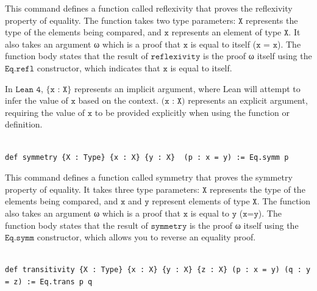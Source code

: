 \documentclass{book}
\theoremstyle{definition}
\newcounter{lcounter}
\begin{document}
This command defines a function called reflexivity that proves the reflexivity property of equality. The function takes two type parameters: $\texttt{X}$ represents the type of the elements being compared, and $\texttt{x}$ represents an element of type $\texttt{X}$. It also takes an argument ω which is a proof that $\texttt{x}$ is equal to itself ($\texttt{x = x}$). The function body states that the result of $\texttt{reflexivity}$ is the proof ω itself using the $\texttt{Eq.refl}$ constructor, which indicates that $\texttt{x}$  is equal to itself.

In $\texttt{Lean 4}$, $\{\texttt{x : X}\}$ represents an implicit argument, where Lean will attempt to infer the value of $\texttt{x}$ based on the context. $\texttt{(x : X)}$ represents an explicit argument, requiring the value of $\texttt{x}$ to be provided explicitly when using the function or definition.

\begin{center}
\begin{tcolorbox}[width=5in,colback={white},title={\begin{center}\texttt{Lean \thelcounter} \addtocounter{lcounter}{1}  \end{center}},colbacktitle=Blue,coltitle=black]
\begin{verbatim}

def symmetry {X : Type} {x : X} {y : X}  (p : x = y) := Eq.symm p

\end{verbatim}
\end{tcolorbox}
\end{center}

This command defines a function called symmetry that proves the symmetry property of equality. It takes three type parameters: $\texttt{X}$ represents the type of the elements being compared, and $\texttt{x}$ and $\texttt{y}$ represent elements of type $\texttt{X}$. The function also takes an argument ω which is a proof that $\texttt{x}$ is equal to $\texttt{y}$ ($\texttt{x=y}$). The function body states that the result of $\texttt{symmetry}$ is the proof ω itself using the $\texttt{Eq.symm}$ constructor, which allows you to reverse an equality proof.

\begin{center}
\begin{tcolorbox}[width=5in,colback={white},title={\begin{center}\texttt{Lean \thelcounter} \addtocounter{lcounter}{1}  \end{center}},colbacktitle=Blue,coltitle=black]
\begin{verbatim}

def transitivity {X : Type} {x : X} {y : X} {z : X} (p : x = y) (q : y = z) := Eq.trans p q

\end{verbatim}
\end{tcolorbox}
\end{center}
\end{document}
